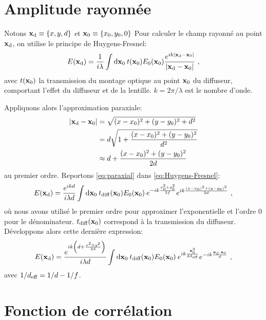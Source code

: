 \section{Amplitude rayonnée}
Notons $\mathbf{x}_{\mathrm{d}} \equiv \left\lbrace x,y,d \right\rbrace$ et $\mathbf{x}_0 \equiv \left\lbrace x_0,y_0,0 \right\rbrace$
Pour calculer le champ rayonné au point $\mathbf{x}_{\mathrm{d}}$, on utilise le principe de Huygens-Fresnel:
\begin{equation}
E(\mathbf{x}_{\mathrm{d}})=\frac{1}{i \lambda} \int {\mathop{}\mathopen{}\mathrm{d}\mathbf{x}_0\: t(\mathbf{x}_0) E_0(\mathbf{x}_0) \frac{e^{ik \left| \mathbf{x}_{\mathrm{d}}-\mathbf{x}_0\right| }}{\left| \mathbf{x}_{\mathrm{d}}- \mathbf{x}_0\right| }} \text{ ,}
\label{eq:Huygens-Fresnel}
\end{equation}
avec $t(\mathbf{x}_0)$ la transmission du montage optique au point $\mathbf{x}_0$ du diffuseur, comportant l'effet du diffuseur et de la lentille. $k=2\pi /\lambda$ est le nombre d'onde.

Appliquons alors l'approximation paraxiale:
\begin{align}
\nonumber \left| \mathbf{x}_{\mathrm{d}} - \mathbf{x}_0 \right| &= \sqrt{(x-x_0)^2+(y-y_0)^2+d^2} \\
\nonumber & = d \sqrt{1+\frac{(x-x_0)^2+(y-y_0)^2}{d^2}} \\
& \approx d+ \frac{(x-x_0)^2+(y-y_0)^2}{2d}
\label{eq:paraxial}
\end{align}
au premier ordre. Reportons \ref{eq:paraxial} dans \ref{eq:Huygens-Fresnel}:
\begin{equation}
E(\mathbf{x}_{\mathrm{d}})=\frac{e^{ikd}}{i \lambda d} \int{\mathop{}\mathopen{}\mathrm{d}\mathbf{x}_0\: t_{\mathrm{diff}}(\mathbf{x}_0) E_0(\mathbf{x}_0) \: e^{-ik \frac{x_0^2+y_0^2}{2f}} e^{ik \frac{(x-x_0)^2+(y-y_0)^2}{2d}}} \text{ ,}
\end{equation}
où nous avons utilisé le premier ordre pour approximer l'exponentielle et l'ordre 0 pour le dénominateur. $t_{\mathrm{diff}}(\mathbf{x}_0)$ correspond à la transmission du diffuseur. Développons alors cette dernière expression:
\begin{equation}
E(\mathbf{x}_{\mathrm{d}})=\frac{e^{i k \left( d + \frac{x^2 + y^2}{2 d}\right) }}{i \lambda d} \int{\mathop{}\mathopen{}\mathrm{d}\mathbf{x}_0\: t_{\mathrm{diff}}(\mathbf{x}_0) E_0(\mathbf{x}_0) \: e^{ik \frac{\mathbf{x}_0^2}{2 d_{\mathrm{eff}}}} e^{-ik\frac{\mathbf{x}_{\mathrm{d}}. \mathbf{x}_0}{d}}} \text{ ,}
\end{equation}
avec $1/d_{\mathrm{eff}}=1/d-1/f$.






\section{Fonction de corrélation}

